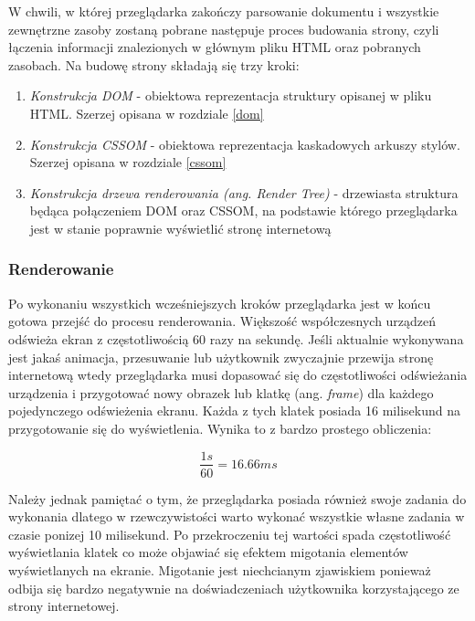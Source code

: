 \documentclass[polish, twoside, 12pt]{mwart}
\begin{document}
W chwili, w której przeglądarka zakończy parsowanie dokumentu i wszystkie zewnętrzne zasoby zostaną pobrane następuje proces budowania strony, czyli łączenia informacji znalezionych w głównym pliku HTML oraz pobranych zasobach. Na budowę strony składają się trzy kroki:

\begin{enumerate}
  \item \emph{Konstrukcja DOM} - obiektowa reprezentacja struktury opisanej w pliku HTML. Szerzej opisana w rozdziale \ref{dom}
  \item \emph{Konstrukcja CSSOM} - obiektowa reprezentacja kaskadowych arkuszy stylów. Szerzej opisana w rozdziale \ref{cssom}
  \item \emph{Konstrukcja drzewa renderowania (ang. Render Tree)} - drzewiasta struktura będąca połączeniem DOM oraz CSSOM, na podstawie którego przeglądarka jest w stanie poprawnie wyświetlić stronę internetową
\end{enumerate}

\subsubsection{Renderowanie}

Po wykonaniu wszystkich wcześniejszych kroków przeglądarka jest w końcu gotowa przejść do procesu renderowania. Większość współczesnych urządzeń odświeża ekran z częstotliwością 60 razy na sekundę. Jeśli aktualnie wykonywana jest jakaś animacja, przesuwanie lub użytkownik zwyczajnie przewija stronę internetową wtedy przeglądarka musi dopasować się do częstotliwości odświeżania urządzenia i przygotować nowy obrazek lub klatkę (ang. \emph{frame}) dla każdego pojedynczego odświeżenia ekranu. Każda z tych klatek posiada 16 milisekund na przygotowanie się do wyświetlenia. Wynika to z bardzo prostego obliczenia:

\begin{equation}
  \frac{1s}{60} = 16.66 ms
\end{equation}

Należy jednak pamiętać o tym, że przeglądarka posiada również swoje zadania do wykonania dlatego w rzewczywistości warto wykonać wszystkie własne zadania w czasie ponizej 10 milisekund. Po przekroczeniu tej wartości spada częstotliwość wyświetlania klatek co może objawiać się efektem migotania elementów wyświetlanych na ekranie. Migotanie jest niechcianym zjawiskiem ponieważ odbija się bardzo negatywnie na doświadczeniach użytkownika korzystającego ze strony internetowej.
\end{document}
